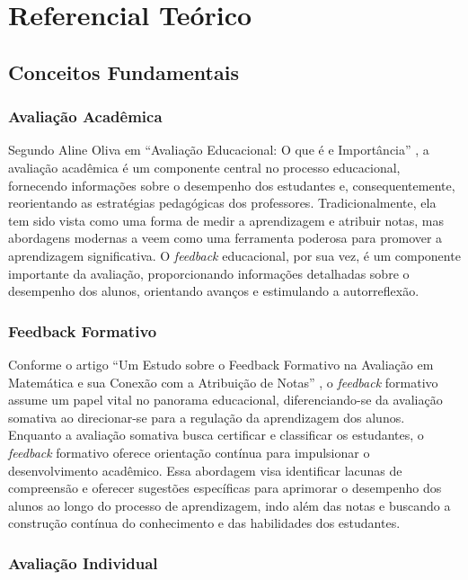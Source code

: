 \chapter{Referencial Teórico}

\section{Conceitos Fundamentais}

\subsection{Avaliação Acadêmica}

Segundo Aline Oliva em ``Avaliação Educacional: O que é e Importância'' \cite{oliva2023}, a avaliação acadêmica é um componente central no processo educacional, fornecendo informações sobre o desempenho dos estudantes e, consequentemente, reorientando as estratégias pedagógicas dos professores. Tradicionalmente, ela tem sido vista como uma forma de medir a aprendizagem e atribuir notas, mas abordagens modernas a veem como uma ferramenta poderosa para promover a aprendizagem significativa. O \textit{feedback} educacional, por sua vez, é um componente importante da avaliação, proporcionando informações detalhadas sobre o desempenho dos alunos, orientando avanços e estimulando a autorreflexão. 

\subsection{Feedback Formativo}

Conforme o artigo ``Um Estudo sobre o Feedback Formativo na Avaliação em Matemática e sua Conexão com a Atribuição de Notas'' \cite{vaz2021}, o \textit{feedback} formativo assume um papel vital no panorama educacional, diferenciando-se da avaliação somativa ao direcionar-se para a regulação da aprendizagem dos alunos. Enquanto a avaliação somativa busca certificar e classificar os estudantes, o \textit{feedback} formativo oferece orientação contínua para impulsionar o desenvolvimento acadêmico. Essa abordagem visa identificar lacunas de compreensão e oferecer sugestões específicas para aprimorar o desempenho dos alunos ao longo do processo de aprendizagem, indo além das notas e buscando a construção contínua do conhecimento e das habilidades dos estudantes.

\subsection{Avaliação Individual}

